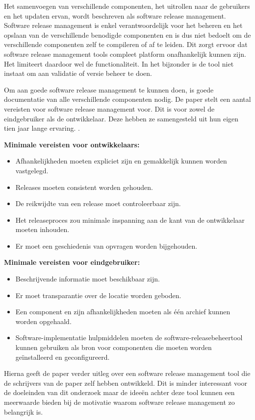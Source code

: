 Het samenvoegen van verschillende componenten, het uitrollen naar de gebruikers en het updaten ervan, wordt beschreven als software release management. Software release management is enkel verantwoordelijk voor het beheren en het opslaan van de verschillende benodigde componenten en is dus niet bedoelt om de verschillende componenten zelf te compileren of af te leiden. Dit zorgt ervoor dat software release management tools compleet platform onafhankelijk kunnen zijn. Het limiteert daardoor wel de functionaliteit. In het bijzonder is de tool niet instaat om aan validatie of versie beheer te doen.

Om aan goede software release management te kunnen doen, is goede documentatie van alle verschillende componenten nodig. De paper stelt een aantal vereisten voor software release management voor. Dit is voor zowel de eindgebruiker als de ontwikkelaar. Deze hebben ze samengesteld uit hun eigen tien jaar lange ervaring. \autocite{Hoek2002}.

\textbf{Minimale vereisten voor ontwikkelaars:}
\begin{itemize}
    \item Afhankelijkheden moeten expliciet zijn en gemakkelijk kunnen worden vastgelegd.
    \item Releases moeten consistent worden gehouden.
    \item De reikwijdte van een release moet controleerbaar zijn.
    \item Het releaseproces zou minimale inspanning aan de kant van de ontwikkelaar moeten inhouden.
    \item Er moet een geschiedenis van opvragen worden bijgehouden.
\end{itemize}
\textbf{Minimale vereisten voor eindgebruiker:}
\begin{itemize}
    \item Beschrijvende informatie moet beschikbaar zijn.
    \item Er moet transparantie over de locatie worden geboden.
    \item Een component en zijn afhankelijkheden moeten als één archief kunnen worden opgehaald.
    \item Software-implementatie hulpmiddelen moeten de software-releasebeheertool kunnen gebruiken als bron voor componenten die moeten worden geïnstalleerd en geconfigureerd.
\end{itemize}
Hierna geeft de paper \autocite{Hoek2002} verder uitleg over een software release management tool die de schrijvers van de paper zelf hebben ontwikkeld. Dit is minder interessant voor de doeleinden van dit onderzoek maar de ideeën achter deze tool kunnen een meerwaarde bieden bij de motivatie waarom software release management zo belangrijk is. 

